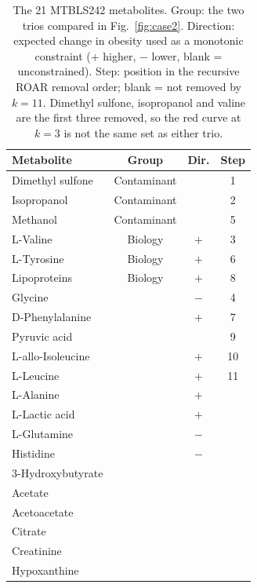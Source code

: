 \documentclass[conference]{IEEEtran}
\begin{document}
\begin{table}[t]
\centering
\caption{The 21 MTBLS242 metabolites. Group: the two trios compared in
Fig.~\ref{fig:case2}. Direction: expected change in obesity used as a
monotonic constraint (+ higher, $-$ lower, blank = unconstrained).
Step: position in the recursive ROAR removal order; blank = not removed by
$k=11$. Dimethyl sulfone, isopropanol and valine are the first three removed,
so the red curve at $k=3$ is not the same set as either trio.}
\label{tab:features}
\footnotesize
\begin{tabular}{@{}lccc@{}}
\toprule
Metabolite & Group & Dir. & Step \\
\midrule
Dimethyl sulfone      & Contaminant & & 1 \\
Isopropanol           & Contaminant & & 2 \\
Methanol              & Contaminant & & 5 \\
\midrule
L-Valine              & Biology & $+$ & 3 \\
L-Tyrosine            & Biology & $+$ & 6 \\
Lipoproteins          & Biology & $+$ & 8 \\
\midrule
Glycine               & & $-$ & 4 \\
D-Phenylalanine       & & $+$ & 7 \\
Pyruvic acid          & & & 9 \\
L-allo-Isoleucine     & & $+$ & 10 \\
L-Leucine             & & $+$ & 11 \\
L-Alanine             & & $+$ & \\
L-Lactic acid         & & $+$ & \\
L-Glutamine           & & $-$ & \\
Histidine             & & $-$ & \\
3-Hydroxybutyrate     & & & \\
Acetate               & & & \\
Acetoacetate          & & & \\
Citrate               & & & \\
Creatinine            & & & \\
Hypoxanthine          & & & \\
\bottomrule
\end{tabular}
\end{table}
\end{document}
